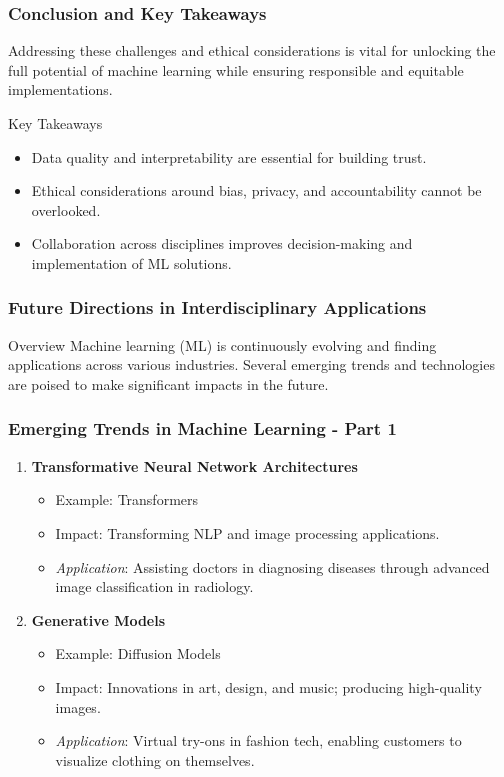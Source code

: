 \documentclass[aspectratio=169]{beamer}
\begin{document}
\begin{frame}[fragile]
    \frametitle{Conclusion and Key Takeaways}
    Addressing these challenges and ethical considerations is vital for unlocking the full potential of machine learning while ensuring responsible and equitable implementations. 
    \begin{block}{Key Takeaways}
        \begin{itemize}
            \item Data quality and interpretability are essential for building trust.
            \item Ethical considerations around bias, privacy, and accountability cannot be overlooked.
            \item Collaboration across disciplines improves decision-making and implementation of ML solutions.
        \end{itemize}
    \end{block}
\end{frame}

\begin{frame}[fragile]
    \frametitle{Future Directions in Interdisciplinary Applications}
    \begin{block}{Overview}
        Machine learning (ML) is continuously evolving and finding applications across various industries. 
        Several emerging trends and technologies are poised to make significant impacts in the future.
    \end{block}
\end{frame}

\begin{frame}[fragile]
    \frametitle{Emerging Trends in Machine Learning - Part 1}
    \begin{enumerate}
        \item \textbf{Transformative Neural Network Architectures}
            \begin{itemize}
                \item Example: Transformers
                \item Impact: Transforming NLP and image processing applications.
                \item \textit{Application}: Assisting doctors in diagnosing diseases through advanced image classification in radiology.
            \end{itemize}

        \item \textbf{Generative Models}
            \begin{itemize}
                \item Example: Diffusion Models
                \item Impact: Innovations in art, design, and music; producing high-quality images.
                \item \textit{Application}: Virtual try-ons in fashion tech, enabling customers to visualize clothing on themselves.
            \end{itemize}
    \end{enumerate}
\end{frame}
\end{document}
